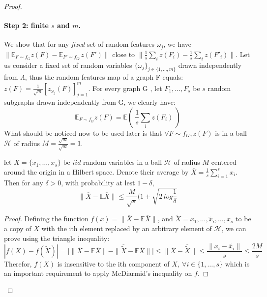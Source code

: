 \begin{proof}
\paragraph{Step 2: finite ${s}$ and $m$.} We show that for any \emph{fixed} set of random features $\omega_j$, we have $\| \mathbb{E}_{F \sim f_G} z(F) - \mathbb{E}_{F' \sim f_{G'}} z(F')\|$ close to $\| \frac{1}{{s}} \sum_i z(F_i) - \frac{1}{{s}} \sum_i z(F'_i)\|$.  \newline
Let us consider a fixed set of random variables $\{\omega_j\}_{j \in \{1,\ldots, m\}}$ drawn independently from $\Lambda$, thus the random features map of a graph F equals: $z(F) = \frac{1}{\sqrt{m}}\left[z_{\omega_j}(F)\right]_{j=1}^m$.\newline
For every graph G , let $F_1,\ldots, F_{s}$ be ${s}$ random subgraphs drawn independently from G, we clearly have: 
\begin{equation}
\label{eq:subsample}
    \mathbb{E}_{F \sim f_G} z(F)= \mathbb{E} (~\frac{1}{{s}} \sum_i z(F_i)~)
\end{equation} 
What should be noticed now to be used later is that $\forall F\sim f_G, z(F)$ is in a ball $\mathcal{H}$ of radius $M=\frac{\sqrt{m}}{\sqrt{m}}=1$.
\begin{lemma}
\label{lemma:vector_hoeffding}
let $X=\{x_1,\ldots,x_{s}\}$ be $iid$ random variables in a ball $\mathcal{H}$ of radius $M$ centered around the origin in a Hilbert space. Denote their average by $\overline{X}=\frac{1}{{s}}\sum_{i=1}^{s}x_i$. Then for any $\delta>0$, with probability at lest $1-\delta$, 
\begin{equation}
\label{eq:vector_hoeffding0}
  \| \overline{X}-\mathbb{E}\overline{X}\|\leq \frac{M}{\sqrt{{s}}}(1+\sqrt{2~log\frac{1}{\delta}}
\end{equation}
\end{lemma}
\begin{proof}
Defining the function $f(x)= \| \overline{X}-\mathbb{E}\overline{X}\|$, and $\widetilde{X}={x_1,\ldots,\widetilde{x}_i,\ldots,x_{s}}$ to be a copy of $X$ with the ith element replaced by an arbitrary element of $\mathcal{H}$, we can prove using the triangle inequality:
\begin{equation}
    |f(X)-f(\widetilde{X})|=\Big|\| \overline{X}-\mathbb{E}\overline{X} \|-\|\overline{\widetilde{X}} - \mathbb{E}\overline{X}  \| \Big|\leq \| \overline{X} - \overline{\widetilde{X}}\|\leq
    \frac{\|x_i - \widetilde{x_i} \|}{{s}}\leq
    \frac{2M}{{s}}
\end{equation}
Therefor, $f(X)$ is insensitive to the ith component of $X,~ \forall i \in \{1,\ldots,{s}\}$ which is an important requirement to apply McDiarmid's inequality on $f$. \newline

\end{proof}
\end{proof}
